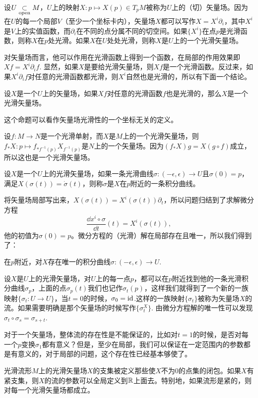 \para 设$U\underset{\mathrm{open}}{\subset} M$，$U$上的映射$X:p\mapsto X(p)\in T_pM$被称为$U$上的（切）矢量场。因为在$U$的每一个局部$V$（至少一个坐标卡内），矢量场$X$都可以写作$X=X^i\partial_i$，其中$X^i$是$V$上的实值函数，而$\partial_i$在不同的点分属不同的切空间。如果$\{X^i\}$在点$p$是光滑函数，则称$X$在$p$处光滑。如果$X$在$U$处处光滑，则称$X$是$U$上的一个光滑矢量场。

对矢量场而言，他可以作用在光滑函数上得到一个函数，在局部的作用效果即$Xf=X^i\partial_if$. 显然，如果$X$是要给光滑矢量场，则$Xf$是一个光滑函数。反过来，如果$X^i\partial_if$对任意的光滑函数都光滑，则$X^i$自然也是光滑的，所以有下面一个结论。

\para 设$X$是一个$U$上的矢量场，如果$Xf$对任意的光滑函数$f$也是光滑的，那么$X$是一个光滑矢量场。

这个命题可以看作矢量场光滑性的一个坐标无关的定义。


\para 设$f:M\to N$是一个光滑单射，而$X$是$M$上的一个光滑矢量场，则$f_*X:p\mapsto f_{*f^{-1}(p)}X_{f^{-1}(p)}$是$N$上的一个矢量场。因为$(f_*X)g=X(g\circ f)$成立，所以这也是一个光滑矢量场。

\para 设$X$是一个$U$上的光滑矢量场，如果一条光滑曲线$\sigma:(-\epsilon,\epsilon)\to U$且$\sigma(0)=p$，满足$X(\sigma(t))=\dot{\sigma}(t)$，则称$\sigma$是$X$在$p$附近的一条积分曲线。

将矢量场局部写出来，$X(\sigma(t))=X^i(\sigma(t))\partial_t$，所以问题归结到了求解微分方程
\[
	\frac{\dd x^i\circ \sigma}{\dd t}(t)=X^i(\sigma(t)),
\]
他的初值为$\sigma(0)=p$。微分方程的（光滑）解在局部存在且唯一，所以我们得到了：

\para 在$p$附近，对$X$存在唯一的积分曲线$\sigma:(-\epsilon,\epsilon)\to U$.

设$X$是$U$上的光滑矢量场，对$U$上的每一点$p$，都可以在$p$附近找到他的一条光滑积分曲线$\sigma_p$，上面的点$\sigma_p(t)$我们也记作$\sigma_t(p)$，这样我们就得到了一个新的一族映射$\{\sigma_t:U\to U\}$，当$t=0$的时候，$\sigma_0=\operatorname{id}$.这样的一族映射$\{\sigma_t\}$被称为矢量场$X$的流。如果需要明确是那个矢量场的时候写作$\{\sigma^X_t\}$. 由微分方程解的唯一性可以发现$\sigma_t\circ \sigma_s=\sigma_{s+t}$.

对于一个矢量场，整体流的存在性是不能保证的，比如对$t=1$的时候，是否对每一个$p$变换$\sigma_1$都有意义？但是，至少在局部，我们可以保证在一定范围内的参数都是有意义的，对于局部的问题，这个存在性已经基本够使了。

\para 光滑流形$M$上的光滑矢量场$X$的支集被定义那些使$X$不为$0$的点集的闭包。如果$X$有紧支集，则$X$的流的参数可以全局定义到$\mathbb{R}$上面去。特别地，如果流形是紧的，则对每一个光滑矢量场都成立。

